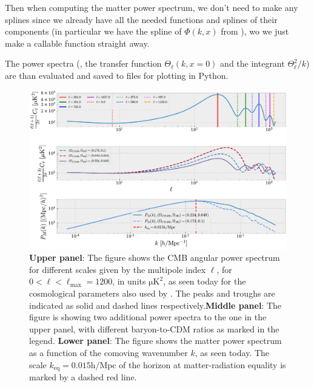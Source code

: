 \documentclass[twocolumn]{aastex62}
\begin{document}
Then when computing the matter power spectrum, we don't need to make any splines since we already have all the needed functions and splines of their components (in particular we have the spline of $\Phi(k, x)$ from \cite{stutzer:2020c}), wo we just make a callable function straight away. 

The power spectra (, the transfer function $\Theta_\ell(k, x = 0)$ and the integrant $\Theta_\ell^2 / k$) are than evaluated and saved to files for plotting in Python.

\begin{figure}
    \includegraphics[scale = 0.65]{Figures/Cell.pdf}
    \caption{\textbf{Upper panel}: The figure shows the CMB angular power spectrum for different scales given by the multipole index $\ell$, for $0 < \ell < \ell_\text{max} = 1200$, in units $\mathrm{\mu K}^2$, as seen today for the cosmological parameters also used by \cite{stutzer:2020a,stutzer:2020b,stutzer:2020c}. The peaks and troughs are indicated as solid and dashed lines respectively.\textbf{Middle panel}: The figure is showing two additional power spectra to the one in the upper panel, with different baryon-to-CDM ratios as marked in the legend.  \textbf{Lower panel}: The figure shows the matter power spectrum as a function of the comoving wavenumber $k$, as seen today. The scale $k_\text{eq} = 0.015 \mathrm{h / Mpc}$ of the horizon at matter-radiation equality is marked by a dashed red line.} 
    \label{fig:Cell}
\end{figure}
\end{document}
